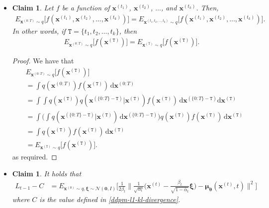 \documentclass[10pt]{article}
\newtheorem{claim}[lemma]{Claim}
\newcommand{\dee}{\mathrm{d}}
\newcommand{\ve}[1]{\mathbf{#1}}
\newcommand{\ves}[1]{\boldsymbol{#1}}
\newcommand{\mcal}[1]{\mathcal{#1}}
\begin{document}
\begin{itemize}
\item \begin{claim} \label{expectation-eliminate-unused-variables}
Let $f$ be a function of $\ve{x}^{(t_1)}$, $\ve{x}^{(t_2)}$, $\dotsc$, and $\ve{x}^{(t_k)}$. Then,
\begin{align*}
  E_{\ve{x}^{(0:T)}\sim q} \big[ f(\ve{x}^{(t_1)}, \ve{x}^{(t_2)}, \dotsc, \ve{x}^{(t_k)}) \big] = E_{\ve{x}^{(t_1, t_2, \dotsc, t_k)} \sim q} \big[ f(\ve{x}^{(t_1)}, \ve{x}^{(t_2)}, \dotsc, \ve{x}^{(t_k)}) \big].
\end{align*}
In other words, if $\mathtt{T} = \{ t_1, t_2, \dotsc, t_k \}$, then
\begin{align*}
  E_{\ve{x}^{(0:T)}\sim q} \big[ f(\ve{x}^{(\mathtt{T})}) \big] = E_{\ve{x}^{(\mathtt{T})} \sim q} \big[ f(\ve{x}^{(\mathtt{T})}) \big].
\end{align*}
\end{claim}

\begin{proof}
We have that
\begin{align*}
  &E_{\ve{x}^{(0:T)}\sim q} \big[ f(\ve{x}^{(\mathtt{T})}) \big] \\
  &= \int q(\ve{x}^{(0:T)}) f(\ve{x}^{(\mathtt{T})})\, \dee \ve{x}^{(0:T)} \\
  &= \int \int q(\ve{x}^{(\mathtt{T})}) q(\ve{x}^{(\{ 0:T \} - \mathtt{T})} | \ve{x}^{(\mathtt{T})}) f( \ve{x}^{(\mathtt{T})} )\, \dee \ve{x}^{(\{0:T\} - \mathtt{T})} \dee \ve{x}^{(\mathtt{T})} \\
  &= \int \bigg( \int q(\ve{x}^{(\{ 0:T \} - \mathtt{T})} | \ve{x}^{(\mathtt{T})})\,  \dee \ve{x}^{(\{0:T\} - \mathtt{T})} \bigg) q(\ve{x}^{(\mathtt{T})}) f( \ve{x}^{(\mathtt{T})} )\, \dee \ve{x}^{(\mathtt{T})} \\
  &= \int q(\ve{x}^{(\mathtt{T})}) f( \ve{x}^{(\mathtt{T})} )\, \dee \ve{x}^{(\mathtt{T})} \\
  &= E_{\ve{x}^{(\mathtt{T})} \sim q} \big[ f(\ve{x}^{(\mathtt{T})}) \big]. 
\end{align*}
as required.
\end{proof}

\item \begin{claim} \label{ddpm-l1-rewrite}
It holds that
\begin{align*}
  L_{t-1} - C &= E_{\ve{x}^{(0)} \sim q, \ves{\xi} \sim \mcal{N}(\ve{0}, I)} \bigg[\frac{1}{2\beta_t} \bigg\| 
  \frac{1}{\sqrt{\alpha_t}} \bigg( \ve{x}^{(t)} - \frac{\beta_t}{\sqrt{1 - \overline{\alpha}_t}} \ves{\xi} \bigg)
    - \ves{\mu}_{\ves{\theta}}(\ve{x}^{(t)}, t) 
  \bigg\|^2 \bigg]
\end{align*}
where $C$ is the value defined in \eqref{ddpm-l1-kl-divergence}.
\end{claim}


\end{itemize}
\end{document}
